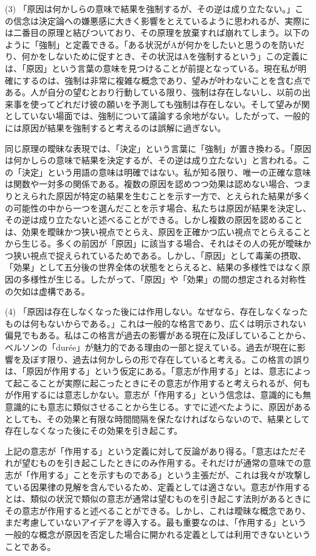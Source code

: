 \documentclass[a4paper,11pt,openany]{ltjsbook}
\begin{document}
(3) 「原因は何かしらの意味で結果を強制するが、その逆は成り立たない。」この信念は決定論への嫌悪感に大きく影響をとえているように思われるが、実際には二番目の原理と結びついており、その原理を放棄すれば崩れてしまう。以下のように「強制」と定義できる。「ある状況がAが何かをしたいと思うのを防いだり、何かをしないために促すとき、その状況はAを強制するという」この定義には、「原因」という言葉の意味を見つけることが前提となっている。現在私が明確にするのは、強制は非常に複雑な概念であり、望みが叶わないことを含む点である。人が自分の望むとおり行動している限り、強制は存在しないし、以前の出来事を使ってどれだけ彼の願いを予測しても強制は存在しない。そして望みが関としていない場面では、強制について議論する余地がない。したがって、一般的には原因が結果を強制すると考えるのは誤解に過ぎない。

同じ原理の曖昧な表現では、「決定」という言葉に「強制」が置き換わる。「原因は何かしらの意味で結果を決定するが、その逆は成り立たない」と言われる。この「決定」という用語の意味は明確ではない。私が知る限り、唯一の正確な意味は関数や一対多の関係である。複数の原因を認めつつ効果は認めない場合、つまりとえられた原因が特定の結果を生むことを示す一方で、とえられた結果が多くの可能性の中から一つを選んだことを示す場合、私たちは原因が結果を決定し、その逆は成り立たないと述べることができる。しかし複数の原因を認めることは、効果を曖昧かつ狭い視点でとらえ、原因を正確かつ広い視点でとらえることから生じる。多くの前因が「原因」に該当する場合、それはその人の死が曖昧かつ狭い視点で捉えられているためである。しかし、「原因」として毒薬の摂取、「効果」として五分後の世界全体の状態をとらえると、結果の多様性ではなく原因の多様性が生じる。したがって、「原因」や「効果」の間の想定される対称性の欠如は虚構である。

(4) 「原因は存在しなくなった後には作用しない。なぜなら、存在しなくなったものは何もないからである。」これは一般的な格言であり、広くは明示されない偏見でもある。私はこの格言が過去の影響がある現在に及ぼしていることから、ベルソンの「durée」が魅力的である理由の一部と捉えている。過去が現在に影響を及ぼす限り、過去は何かしらの形で存在していると考える。この格言の誤りは、「原因が作用する」という仮定にある。「意志が作用する」とは、意志によって起こることが実際に起こったときにその意志が作用すると考えられるが、何もが作用するには意志しかない。意志が「作用する」という信念は、意識的にも無意識的にも意志に類似させることから生じる。すでに述べたように、原因があるとしても、その効果と有限な時間間隔を保たなければならないので、結果として存在しなくなった後にその効果を引き起こす。

上記の意志が「作用する」という定義に対して反論があり得る。「意志はただそれが望むものを引き起こしたときにのみ作用する。それだけが通常の意味での意志が「作用する」ことを示すものである」という主張だが、これは我々が攻撃している因果律の見解を含んでいるため、定義としては適さない。意志が作用するとは、類似の状況で類似の意志が通常は望むものを引き起こす法則があるときにその意志が作用すると述べることができる。しかし、これは曖昧な概念であり、まだ考慮していないアイデアを導入する。最も重要なのは、「作用する」という一般的な概念が原因を否定した場合に開かれる定義としては利用できないということである。
\end{document}
